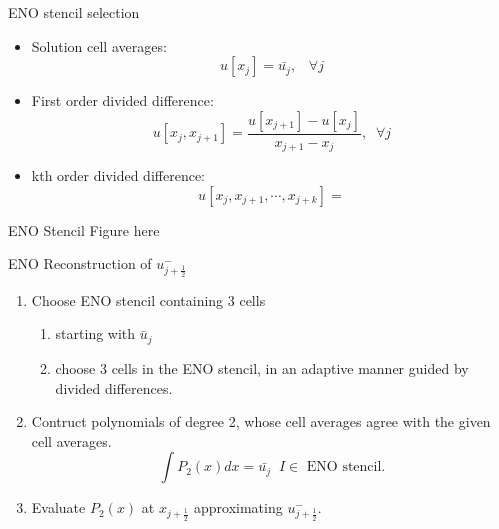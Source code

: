 \documentclass{beamer}
\begin{document}
\begin{frame}{ENO stencil selection}
    \begin{itemize}
        \item Solution cell averages:
        \begin{equation}
            u[x_j] = \bar{u_j}, \; \; \; \forall j
        \end{equation}
        
        \item First order divided difference:
        \begin{equation}
            u[x_j,x_{j+1}] = \frac{u[x_{j+1}] - u[x_j] }{x_{j+1} - x_j}, \; \; \forall j
        \end{equation}
        \item kth order divided difference:
        \begin{equation}
            u[x_j,x_{j+1},\cdots,x_{j+k}] = 
        \end{equation}
    \end{itemize}
\end{frame}

\begin{frame}{ENO Stencil}
    Figure here
\end{frame}

\begin{frame}{ENO Reconstruction of $u^-_{j+\frac{1}{2}}$}
\begin{enumerate}
    \item Choose ENO stencil containing 3 cells
    \begin{enumerate}
        \item starting with $\bar{u}_j$
        \item choose 3 cells in the ENO stencil, in an adaptive manner guided by divided differences.
    \end{enumerate}
    
    \item Contruct polynomials of degree 2, whose cell averages agree with the given cell averages.
    \begin{equation}
        \int P_2(x)dx = \bar{u_j} \; \; I \in \text{ ENO stencil.}
    \end{equation}
    
    \item Evaluate $P_2(x)$ at $x_{j+\frac{1}{2}}$ approximating $u^-_{j+\frac{1}{2}}$.
\end{enumerate}
\end{frame}
\end{document}
